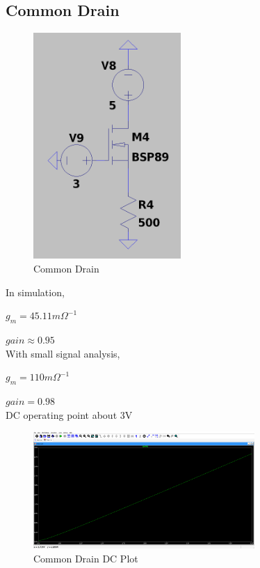 \documentclass{article}
\begin{document}
\subsection{Common Drain}

\begin{figure}[H]
    \centering
    \includegraphics[width=0.5\textwidth]{CommonDrain.jpg}
    \caption{Common Drain}
\end{figure}

In simulation,

$g_m = 45.11m\Omega^{-1}$

$gain \approx 0.95$\\
With small signal analysis,

$g_m = 110m\Omega^{-1}$

$gain = 0.98$\\
DC operating point about 3V

\begin{figure}[H]
    \centering
    \includegraphics[width=0.75\textwidth]{CommonDrainPlot.jpg}
    \caption{Common Drain DC Plot}
\end{figure}
\end{document}
